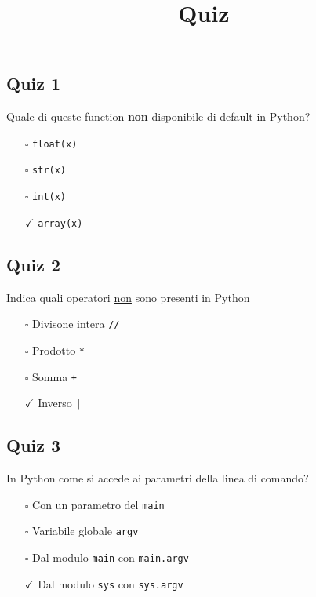 \documentclass{article}
\title{Quiz}
\begin{document}
\pagestyle{fancy}
\fancyhf{}

\subsection*{Quiz 1}
Quale di queste function \textbf{non} disponibile di default in Python?
\begin{itemize}
  \item[$\square$] \texttt{float(x)}
  \item[$\square$] \texttt{str(x)}
  \item[$\square$] \texttt{int(x)}
  \item[$\checkmark$] \texttt{array(x)}
\end{itemize}
\subsection*{Quiz 2}
Indica quali operatori \underline{non} sono presenti in Python
\begin{itemize}
  \item[$\square$] Divisone intera \texttt{//}
  \item[$\square$] Prodotto \texttt{*}
  \item[$\square$] Somma \texttt{+}
  \item[$\checkmark$] Inverso \texttt{|}
\end{itemize}
\subsection*{Quiz 3}
In Python come si accede ai parametri della linea di comando?
\begin{itemize}
  \item[$\square$] Con un parametro del \texttt{main}
  \item[$\square$] Variabile globale \texttt{argv}
  \item[$\square$] Dal modulo \texttt{main} con \texttt{main.argv}
  \item[$\checkmark$] Dal modulo \texttt{sys} con \texttt{sys.argv}
\end{itemize}
\end{document}
